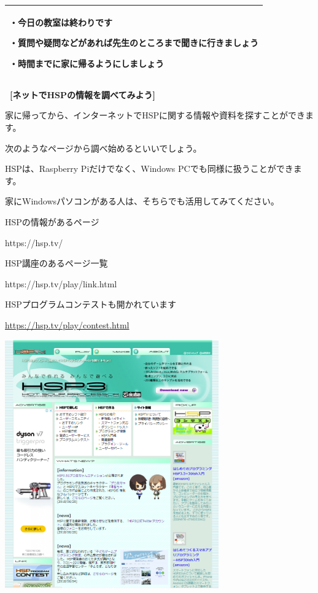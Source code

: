\documentclass[a4paper,dvipdfmx]{jarticle}
\begin{document}
\begin{flushleft}
\tablefirsthead{}
\tablehead{}
\tabletail{}
\tablelasttail{}
\begin{supertabular}{|m{10.542cm}|}
\hline
・今日の教室は終わりです

・質問や疑問などがあれば先生のところまで聞きに行きましょう

・時間までに家に帰るようにしましょう\\\hline
\end{supertabular}
\end{flushleft}

\bigskip

{\bfseries
\ [ネットでHSPの情報を調べてみよう]}


\bigskip

家に帰ってから、インターネットでHSPに関する情報や資料を探すことができます。

次のようなページから調べ始めるといいでしょう。

HSPは、Raspberry Piだけでなく、Windows
PCでも同様に扱うことができます。

家にWindowsパソコンがある人は、そちらでも活用してみてください。


\bigskip

HSPの情報があるページ

https://hsp.tv/


\bigskip

HSP講座のあるページ一覧

https://hsp.tv/play/link.html


\bigskip

HSPプログラムコンテストも開かれています

\url{https://hsp.tv/play/contest.html}


\bigskip


\bigskip



\begin{center}
\includegraphics[width=9.202cm,height=10.717cm]{text02-img/text02-img055.png}

\end{center}
\end{document}
